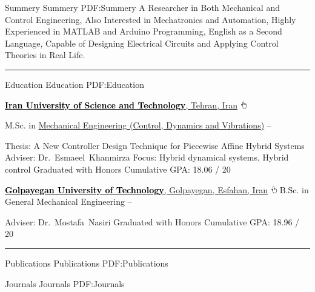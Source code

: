\documentclass[a4paper,MMMyyyy,nonstopmode]{ResumeTemplate}
\begin{document}
\begin{Body}
\Section
{Summery}
{Summery}
{PDF:Summery}
\enspace A Researcher in Both Mechanical and Control Engineering, Also Interested in Mechatronics and Automation, Highly Experienced in MATLAB and Arduino Programming, English as a Second Language, Capable of Designing Electrical Circuits and Applying Control Theories in Real Life.

\textcolor{Forestg}{\hrule height 0.1cm}

\Section
{Education}
{Education}
{PDF:Education}

\Entry
\href{http://iust.ac.ir/en}
{\textcolor{black}{\textbf{Iran University of Science and Technology}}, Tehran, Iran} \includegraphics[height=9pt]{icons/hand-cursor.png}

\Gap
\BulletItem
M.Sc. in
\href{http://mech.iust.ac.ir/en}
{Mechanical Engineering \small{(Control, Dynamics and Vibrations)}}
\hfill
{ --
}
\begin{Detail}
\SubBulletItem
Thesis:
{A New Controller Design Technique for Piecewise Affine Hybrid Systems}
\SubBulletItem
Adviser:
Dr.~Esmaeel~Khanmirza
\SubBulletItem
Focus:
Hybrid dynamical systems, Hybrid control
\SubBulletItem
Graduated with Honors
\SubBulletItem
Cumulative GPA: 18.06 / 20
\end{Detail}


\BigGap
\Entry
\href{http://gut.ac.ir/en}
{\textcolor{black}{\textbf{Golpayegan University of Technology}},
Golpayegan, Esfahan, Iran} \includegraphics[height=9pt]{icons/hand-cursor.png}
\Gap
\BulletItem
B.Sc. in
{General Mechanical Engineering}
\hfill
{} --
\begin{Detail}
\SubBulletItem
Adviser:
Dr.~Mostafa~Nasiri
\SubBulletItem
Graduated with Honors
\SubBulletItem
Cumulative GPA: 18.96 / 20
\end{Detail}


\textcolor{Forestg}{\hrule height 0.1cm}
\Section
{Publications}
{Publications}
{PDF:Publications}

\SubSection
{Journals}
{Journals}
{PDF:Journals}


\end{Body}
\end{document}
